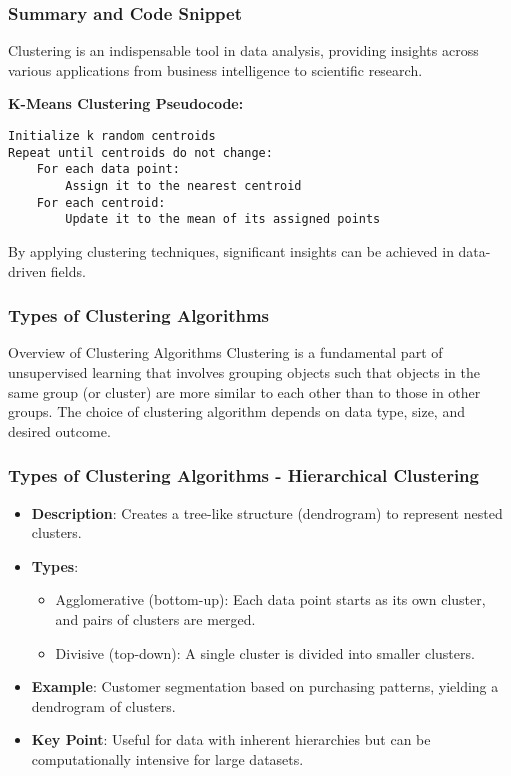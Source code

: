 \documentclass[aspectratio=169]{beamer}
\begin{document}
\begin{frame}[fragile]
    \frametitle{Summary and Code Snippet}
    Clustering is an indispensable tool in data analysis, providing insights across various applications from business intelligence to scientific research.
    
    \textbf{K-Means Clustering Pseudocode:}
    \begin{block}{}
    \begin{lstlisting}
Initialize k random centroids
Repeat until centroids do not change:
    For each data point:
        Assign it to the nearest centroid
    For each centroid:
        Update it to the mean of its assigned points
    \end{lstlisting}
    \end{block}
    
    By applying clustering techniques, significant insights can be achieved in data-driven fields.
\end{frame}

\begin{frame}[fragile]
    \frametitle{Types of Clustering Algorithms}
    
    \begin{block}{Overview of Clustering Algorithms}
        Clustering is a fundamental part of unsupervised learning that involves grouping objects such that objects in the same group (or cluster) are more similar to each other than to those in other groups. The choice of clustering algorithm depends on data type, size, and desired outcome.
    \end{block}
\end{frame}

\begin{frame}[fragile]
    \frametitle{Types of Clustering Algorithms - Hierarchical Clustering}

    \begin{itemize}
        \item \textbf{Description}: Creates a tree-like structure (dendrogram) to represent nested clusters.
        \item \textbf{Types}:
        \begin{itemize}
            \item Agglomerative (bottom-up): Each data point starts as its own cluster, and pairs of clusters are merged.
            \item Divisive (top-down): A single cluster is divided into smaller clusters.
        \end{itemize}
        \item \textbf{Example}: Customer segmentation based on purchasing patterns, yielding a dendrogram of clusters.
        \item \textbf{Key Point}: Useful for data with inherent hierarchies but can be computationally intensive for large datasets.
    \end{itemize}
\end{frame}
\end{document}
